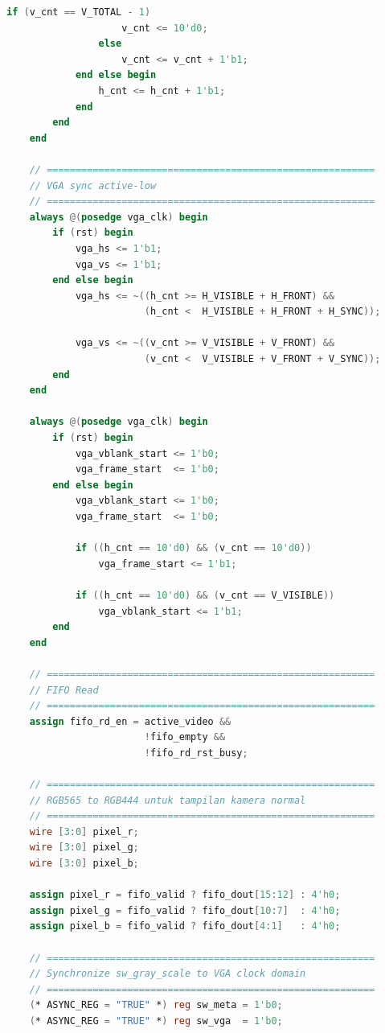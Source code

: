 \begin{lstlisting}[language=Verilog, title={Kode untuk menampilkan data hasil vga ke monitor}, label={code:vga-rgb-565}]
                if (v_cnt == V_TOTAL - 1)
                    v_cnt <= 10'd0;
                else
                    v_cnt <= v_cnt + 1'b1;
            end else begin
                h_cnt <= h_cnt + 1'b1;
            end
        end
    end

    // =========================================================
    // VGA sync active-low
    // =========================================================
    always @(posedge vga_clk) begin
        if (rst) begin
            vga_hs <= 1'b1;
            vga_vs <= 1'b1;
        end else begin
            vga_hs <= ~((h_cnt >= H_VISIBLE + H_FRONT) &&
                        (h_cnt <  H_VISIBLE + H_FRONT + H_SYNC));

            vga_vs <= ~((v_cnt >= V_VISIBLE + V_FRONT) &&
                        (v_cnt <  V_VISIBLE + V_FRONT + V_SYNC));
        end
    end

    always @(posedge vga_clk) begin
        if (rst) begin
            vga_vblank_start <= 1'b0;
            vga_frame_start  <= 1'b0;
        end else begin
            vga_vblank_start <= 1'b0;
            vga_frame_start  <= 1'b0;

            if ((h_cnt == 10'd0) && (v_cnt == 10'd0))
                vga_frame_start <= 1'b1;

            if ((h_cnt == 10'd0) && (v_cnt == V_VISIBLE))
                vga_vblank_start <= 1'b1;
        end
    end

    // =========================================================
    // FIFO Read
    // =========================================================
    assign fifo_rd_en = active_video &&
                        !fifo_empty &&
                        !fifo_rd_rst_busy;

    // =========================================================
    // RGB565 to RGB444 untuk tampilan kamera normal
    // =========================================================
    wire [3:0] pixel_r;
    wire [3:0] pixel_g;
    wire [3:0] pixel_b;

    assign pixel_r = fifo_valid ? fifo_dout[15:12] : 4'h0;
    assign pixel_g = fifo_valid ? fifo_dout[10:7]  : 4'h0;
    assign pixel_b = fifo_valid ? fifo_dout[4:1]   : 4'h0;

    // =========================================================
    // Synchronize sw_gray_scale to VGA clock domain
    // =========================================================
    (* ASYNC_REG = "TRUE" *) reg sw_meta = 1'b0;
    (* ASYNC_REG = "TRUE" *) reg sw_vga  = 1'b0;


\end{lstlisting}
